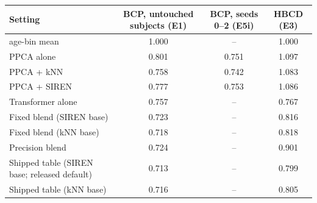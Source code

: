 \begin{tabular}{lccc}
\toprule
Setting & BCP, untouched subjects (E1) & BCP, seeds 0--2 (E5i) & HBCD (E3) \\
\midrule
age-bin mean & 1.000 & -- & 1.000 \\
PPCA alone & 0.801 & 0.751 & 1.097 \\
PPCA + kNN & 0.758 & 0.742 & 1.083 \\
PPCA + SIREN & 0.777 & 0.753 & 1.086 \\
Transformer alone & 0.757 & -- & 0.767 \\
Fixed blend (SIREN base) & 0.723 & -- & 0.816 \\
Fixed blend (kNN base) & 0.718 & -- & 0.818 \\
Precision blend & 0.724 & -- & 0.901 \\
Shipped table (SIREN base; released default) & 0.713 & -- & 0.799 \\
Shipped table (kNN base) & 0.716 & -- & 0.805 \\
\bottomrule
\end{tabular}
